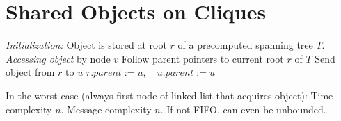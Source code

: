 \documentclass[11pt, oneside]{book}   						%
\begin{document}

\section{Shared Objects on Cliques}
\textbf{}
\begin{algorithm}
\caption{}\label{pointerforward}
\begin{algorithmic}[1]
\Statex\textit{Initialization: }{Object is stored at root $r$ of a precomputed spanning tree $T$.}
\Statex
\Statex\textit{Accessing object} by node $v$
\State Follow parent pointers to current root $r$ of $T$
\State Send object from $r$ to $u$
\State $r.parent := u, \quad u.parent := u$
\end{algorithmic}
\end{algorithm}
\begin{mythm} In the worst case (always first node of linked list that acquires object): Time complexity $n$. Message complexity $n$. If not FIFO, can even be unbounded.\end{mythm}
\end{document}
